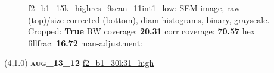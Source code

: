 \begin{figure}[h!]
\label{semimg22}
\caption*{\hyperlink{covtableaug_13_12}{\color{blue} \small \ttfamily f2\_b1\_15k\_highres\_9scan\_11int1\_low}: SEM image, raw (top)/size-corrected (bottom), diam histograms, binary, grayscale.\\Cropped: {\bf True} \;\; BW coverage: {\bf 20.31} \:\: corr coverage: {\bf 70.57} \:\: hex fillfrac: {\bf 16.72} \:\: man-adjustment: {\bf \color{blue}{Yes}}}
\end{figure}
\newpage

\begin{textblock}{5}(4,1.0)
{\bf \textsc{aug\_13\_12}}
\hspace{4.5cm}
\hyperlink{covtableaug_13_12}{\color{blue} \large \ttfamily f2\_b1\_30k31\_high}
\end{textblock}

